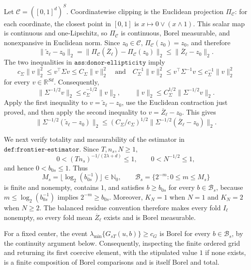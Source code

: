 Let \(\mathcal C=([0,1]^d)^S\).  Coordinatewise clipping is the Euclidean projection \(\Pi_{\mathcal C}\): for each coordinate, the closest point in \([0,1]\) is \(x\mapsto 0\vee(x\wedge1)\).  This scalar map is continuous and one-Lipschitz, so \(\Pi_{\mathcal C}\) is continuous, Borel measurable, and nonexpansive in Euclidean norm.  Since \(z_0\in\mathcal C\), \(\Pi_{\mathcal C}(z_0)=z_0\), and therefore
\[
 \|\widetilde z_\ell-z_0\|_2
 =\|\Pi_{\mathcal C}(\overline Z_\ell)-\Pi_{\mathcal C}(z_0)\|_2
 \le \|\overline Z_\ell-z_0\|_2.
\]
The two inequalities in \(\texttt{ass:donor-ellipticity}\) imply
\[
 c_\Sigma\|v\|_2^2\le v^\top\Sigma v\le C_\Sigma\|v\|_2^2
 \quad\text{and}\quad
 C_\Sigma^{-1}\|v\|_2^2\le v^\top\Sigma^{-1}v
 \le c_\Sigma^{-1}\|v\|_2^2
\]
for every \(v\in\mathbb R^{Sd}\).  Consequently,
\[
 \|\Sigma^{-1/2}v\|_2\le c_\Sigma^{-1/2}\|v\|_2,
 \qquad
 \|v\|_2\le C_\Sigma^{1/2}\|\Sigma^{-1/2}v\|_2.
\]
Apply the first inequality to \(v=\widetilde z_\ell-z_0\), use the Euclidean contraction just proved, and then apply the second inequality to \(v=\overline Z_\ell-z_0\).  This gives
\[
 \|\Sigma^{-1/2}(\widetilde z_\ell-z_0)\|_2
 \le (C_\Sigma/c_\Sigma)^{1/2}
 \|\Sigma^{-1/2}(\overline Z_\ell-z_0)\|_2.
\]

We next verify totality and measurability of the estimator in \(\texttt{def:frontier-estimator}\).  Since \(T,n_s,N\ge1\),
\[
 0<(Tn_s)^{-1/(2\lambda+d)}\le1,
 \qquad 0<N^{-1/2}\le1,
\]
and hence \(0<b_{0s}\le1\).  Thus
\[
 M_s=\lfloor\log_2(b_{0s}^{-1})\rfloor\in\mathbb N_0,
 \qquad
 \mathcal B_s=\{2^{-m}:0\le m\le M_s\}
\]
is finite and nonempty, contains \(1\), and satisfies \(b\ge b_{0s}\) for every \(b\in\mathcal B_s\), because \(m\le\log_2(b_{0s}^{-1})\) implies \(2^{-m}\ge b_{0s}\).  Moreover, \(K_N=1\) when \(N=1\) and \(K_N=2\) when \(N\ge2\).  The balanced residue convention therefore makes every fold \(I_\ell\) nonempty, so every fold mean \(\overline Z_\ell\) exists and is Borel measurable.

For a fixed center, the event \(\lambda_{\min}\{G_{sT}(u,b)\}\ge c_G\) is Borel for every \(b\in\mathcal B_s\), by the continuity argument below.  Consequently, inspecting the finite ordered grid and returning its first coercive element, with the stipulated value \(1\) if none exists, is a finite composition of Borel comparisons and is itself Borel and total.

